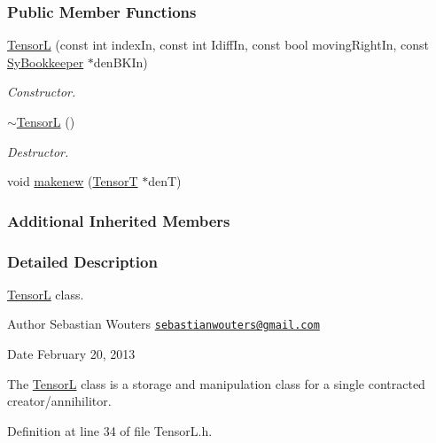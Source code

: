 \subsubsection*{Public Member Functions}
\begin{DoxyCompactItemize}
\item 
\hyperlink{classCheMPS2_1_1TensorL_afa66a63fa8cd26f49de8b93bed3d4bda}{Tensor\-L} (const int index\-In, const int Idiff\-In, const bool moving\-Right\-In, const \hyperlink{classCheMPS2_1_1SyBookkeeper}{Sy\-Bookkeeper} $\ast$den\-B\-K\-In)
\begin{DoxyCompactList}\small\item\em Constructor. \end{DoxyCompactList}\item 
\hypertarget{classCheMPS2_1_1TensorL_a1e9e16eafa80c1268be6adff9fcbe63b}{\hyperlink{classCheMPS2_1_1TensorL_a1e9e16eafa80c1268be6adff9fcbe63b}{$\sim$\-Tensor\-L} ()}\label{classCheMPS2_1_1TensorL_a1e9e16eafa80c1268be6adff9fcbe63b}

\begin{DoxyCompactList}\small\item\em Destructor. \end{DoxyCompactList}\item 
void \hyperlink{classCheMPS2_1_1TensorL_a5896b5010d9d8c96b02f0d06aa1ea727}{makenew} (\hyperlink{classCheMPS2_1_1TensorT}{Tensor\-T} $\ast$den\-T)
\end{DoxyCompactItemize}
\subsubsection*{Additional Inherited Members}


\subsubsection{Detailed Description}
\hyperlink{classCheMPS2_1_1TensorL}{Tensor\-L} class. \begin{DoxyAuthor}{Author}
Sebastian Wouters \href{mailto:sebastianwouters@gmail.com}{\tt sebastianwouters@gmail.\-com} 
\end{DoxyAuthor}
\begin{DoxyDate}{Date}
February 20, 2013
\end{DoxyDate}
The \hyperlink{classCheMPS2_1_1TensorL}{Tensor\-L} class is a storage and manipulation class for a single contracted creator/annihilitor. 

Definition at line 34 of file Tensor\-L.\-h.



